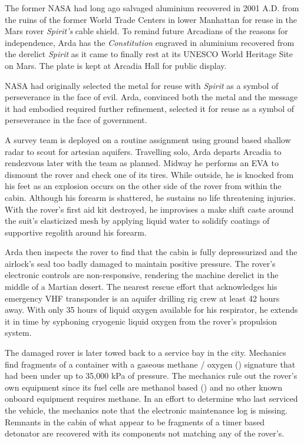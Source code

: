 The former NASA had long ago salvaged aluminium recovered in 2001 A.D. from the ruins of the former World Trade Centers in lower Manhattan for reuse in the Mars rover {\it Spirit's} cable shield. To remind future Arcadians of the reasons for independence, Arda has the {\it Constitution} engraved in aluminium recovered from the derelict {\it Spirit} as it came to finally rest at its UNESCO World Heritage Site on Mars. The plate is kept at Arcadia Hall for public display.

NASA had originally selected the metal for reuse with {\it Spirit} as a symbol of perseverance in the face of evil. Arda, convinced both the metal and the message it had embodied required further refinement, selected it for reuse as a symbol of perseverance in the face of government.
\StopTimelineDate

A survey team is deployed on a routine assignment using ground based shallow radar to scout for artesian aquifers. Travelling solo, Arda departs Arcadia to rendezvous later with the team as planned. Midway he performs an EVA to dismount the rover and check one of its tires. While outside, he is knocked from his feet as an explosion occurs on the other side of the rover from within the cabin. Although his forearm is shattered, he sustains no life threatening injuries. With the rover's first aid kit destroyed, he improvises a make shift caste around the suit's elasticized mesh by applying liquid water to solidify coatings of supportive regolith around his forearm.

Arda then inspects the rover to find that the cabin is fully depressurized and the airlock's seal too badly damaged to maintain positive pressure. The rover's electronic controls are non-responsive, rendering the machine derelict in the middle of a Martian desert. The nearest rescue effort that acknowledges his emergency VHF transponder is an aquifer drilling rig crew at least 42 hours away. With only 35 hours of liquid oxygen available for his respirator, he extends it in time by syphoning cryogenic liquid oxygen from the rover's propulsion system.

The damaged rover is later towed back to a service bay in the city. Mechanics find fragments of a container with a gaseous methane / oxygen () signature that had been under up to 35,000 kPa of pressure. The mechanics rule out the rover's own equipment since its fuel cells are methanol based () and no other known onboard equipment requires methane. In an effort to determine who last serviced the vehicle, the mechanics note that the electronic maintenance log is missing. Remnants in the cabin of what appear to be fragments of a timer based detonator are recovered with its components not matching any of the rover's.
\StopTimelineDate

